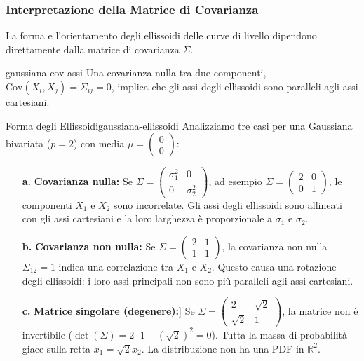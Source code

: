 \subsubsection*{Interpretazione della Matrice di Covarianza}

La forma e l'orientamento degli ellissoidi delle curve di livello dipendono
direttamente dalla matrice di covarianza $\Sigma$.

\begin{nota}{}{gaussiana-cov-assi}
Una covarianza nulla tra due componenti, $\text{Cov}(X_i, X_j) = \Sigma_{ij} =
0$, implica che gli assi degli ellissoidi sono paralleli agli assi cartesiani.
\end{nota}

\begin{esempio}{Forma degli Ellissoidi}{gaussiana-ellissoidi}
Analizziamo tre casi per una Gaussiana bivariata ($p=2$) con media $\mu =
\begin{pmatrix} 0 \\ 0 \end{pmatrix}$:
\begin{enumerate}
    \item[\textbf{a.}] \textbf{Covarianza nulla:} Se $\Sigma = \begin{pmatrix}
    \sigma_1^2 & 0 \\ 0 & \sigma_2^2 \end{pmatrix}$, ad esempio $\Sigma =
    \begin{pmatrix} 2 & 0 \\ 0 & 1 \end{pmatrix}$, le componenti $X_1$ e $X_2$
    sono incorrelate. Gli assi degli ellissoidi sono allineati con gli assi
    cartesiani e la loro larghezza è proporzionale a $\sigma_1$ e $\sigma_2$.
    
    \item[\textbf{b.}] \textbf{Covarianza non nulla:} Se $\Sigma =
    \begin{pmatrix} 2 & 1 \\ 1 & 1 \end{pmatrix}$, la covarianza non nulla
    $\Sigma_{12}=1$ indica una correlazione tra $X_1$ e $X_2$. Questo causa una
    rotazione degli ellissoidi: i loro assi principali non sono più paralleli
    agli assi cartesiani.
    
    \item[\textbf{c.}] \textbf{Matrice singolare (degenere):}] Se $\Sigma =
    \begin{pmatrix} 2 & \sqrt{2} \\ \sqrt{2} & 1 \end{pmatrix}$, la matrice non
    è invertibile ($\det(\Sigma) = 2 \cdot 1 - (\sqrt{2})^2 = 0$). Tutta la
    massa di probabilità giace sulla retta $x_1 = \sqrt{2} x_2$. La
    distribuzione non ha una PDF in $\mathbb{R}^2$.
\end{enumerate}
\end{esempio}

